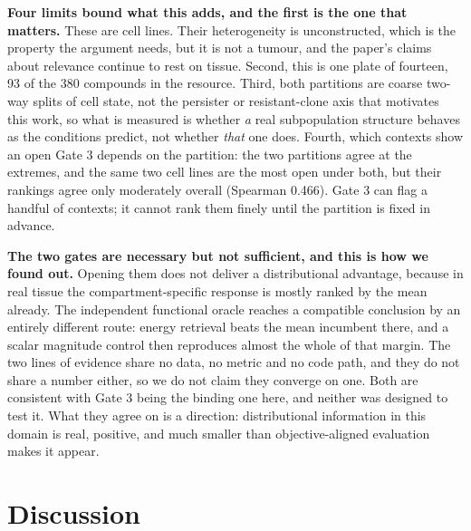 \documentclass[11pt,letterpaper]{article}
\newcommand{\TAHOEPARTAGREE}{0.466}
\begin{document}
\textbf{Four limits bound what this adds, and the first is the one that matters.} These are cell
lines. Their heterogeneity is unconstructed, which is the property the argument needs, but it is
not a tumour, and the paper's claims about relevance continue to rest on tissue. Second, this is
one plate of fourteen, 93 of the 380 compounds in the resource. Third, both partitions are coarse
two-way splits of cell state, not the persister or resistant-clone axis that motivates this work,
so what is measured is whether \emph{a} real subpopulation structure behaves as the conditions
predict, not whether \emph{that} one does. Fourth, which contexts show an open Gate 3 depends on
the partition: the two partitions agree at the extremes, and the same two cell lines are the most
open under both, but their rankings agree only moderately overall (Spearman \TAHOEPARTAGREE{}).
Gate 3 can flag a handful of contexts; it cannot rank them finely until the partition is fixed in
advance.

\textbf{The two gates are necessary but not sufficient, and this is how we found out.} Opening them
does not deliver a distributional advantage, because in real tissue the compartment-specific
response is mostly ranked by the mean already. The independent functional oracle reaches a
compatible conclusion by an entirely different route: energy retrieval beats the mean incumbent
there, and a scalar magnitude control then reproduces almost the whole of that margin. The two
lines of evidence share no data, no metric and no code path, and they do not share a number
either, so we do not claim they converge on one. Both are consistent with Gate 3 being the binding
one here, and neither was designed to test it. What they agree on is a direction: distributional
information in this domain is real, positive, and much smaller than objective-aligned evaluation
makes it appear.


\section*{Discussion}
\end{document}
